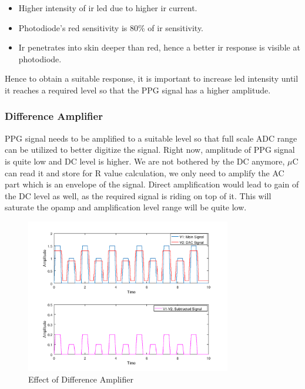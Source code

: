			\begin{itemize}
				
				\item Higher intensity of ir led due to higher ir current.
				\item Photodiode's red sensitivity is 80\% of ir sensitivity. 
				\item Ir penetrates into skin deeper than red, hence a better ir response is visible at photodiode\cite{penetrate}.
				
			\end{itemize}		
			Hence to obtain a suitable response, it is important to increase led intensity until it reaches a required level so that the PPG signal has a higher amplitude.	
			
		\subsubsection{Difference Amplifier}
		
			PPG signal needs to be amplified to a suitable level so that full scale ADC range can be utilized to better digitize the signal. Right now, amplitude of PPG signal is quite low and DC level is higher. We are not bothered by the DC anymore, $\mu$C can read it and store for R value calculation, we only need to amplify the AC part which is an envelope of the signal. Direct amplification would lead to gain of the DC level as well, as the required signal is riding on top of it. This will saturate the opamp and amplification level range will be quite low. 
			
			\begin{figure}[ht!]
				\centering
				\includegraphics[width=0.8\textwidth]{../common/circuit/diff.png}
				\caption{Effect of Difference Amplifier}
				\label{fig:diff}
			\end{figure}	
			
